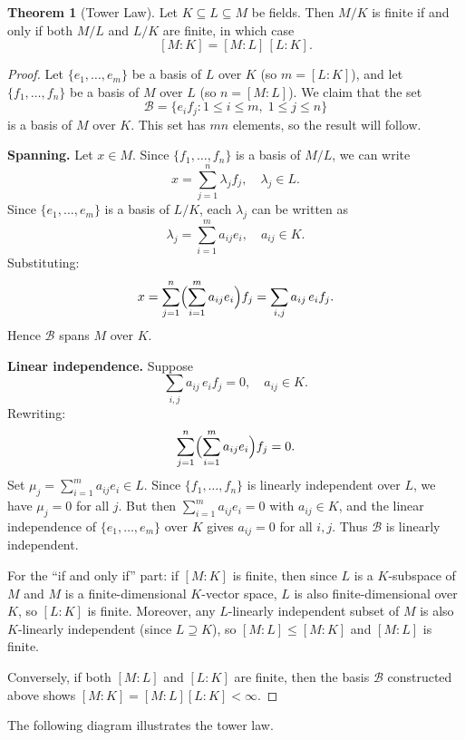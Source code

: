 \documentclass[12pt,a4paper,openany]{book}
\theoremstyle{definition}
\newtheorem{theorem}{Theorem}[chapter]
\theoremstyle{remark}
\begin{document}
\begin{theorem}[Tower Law]
\label{thm:tower-law}
Let $K \subseteq L \subseteq M$ be fields. Then $M/K$ is finite if and
only if both $M/L$ and $L/K$ are finite, in which case
\[
  [M:K] = [M:L]\,[L:K].
\]
\end{theorem}

\begin{proof}
Let $\{e_1, \dots, e_m\}$ be a basis of $L$ over $K$ (so
$m = [L:K]$), and let $\{f_1, \dots, f_n\}$ be a basis of $M$ over
$L$ (so $n = [M:L]$). We claim that the set
\[
  \mathcal{B} = \{ e_i f_j : 1 \le i \le m,\; 1 \le j \le n \}
\]
is a basis of $M$ over $K$. This set has $mn$ elements, so the result
will follow.

\textbf{Spanning.} Let $x \in M$. Since $\{f_1, \dots, f_n\}$ is a
basis of $M/L$, we can write
\[
  x = \sum_{j=1}^n \lambda_j f_j, \quad \lambda_j \in L.
\]
Since $\{e_1, \dots, e_m\}$ is a basis of $L/K$, each $\lambda_j$ can
be written as
\[
  \lambda_j = \sum_{i=1}^m a_{ij} e_i, \quad a_{ij} \in K.
\]
Substituting:
\[
  x = \sum_{j=1}^n \Bigl(\sum_{i=1}^m a_{ij} e_i\Bigr) f_j
    = \sum_{i,j} a_{ij}\, e_i f_j.
\]
Hence $\mathcal{B}$ spans $M$ over $K$.

\textbf{Linear independence.} Suppose
\[
  \sum_{i,j} a_{ij}\, e_i f_j = 0, \quad a_{ij} \in K.
\]
Rewriting:
\[
  \sum_{j=1}^n \Bigl(\sum_{i=1}^m a_{ij} e_i\Bigr) f_j = 0.
\]
Set $\mu_j = \sum_{i=1}^m a_{ij} e_i \in L$. Since
$\{f_1, \dots, f_n\}$ is linearly independent over $L$, we have
$\mu_j = 0$ for all $j$. But then
$\sum_{i=1}^m a_{ij} e_i = 0$ with $a_{ij} \in K$, and the
linear independence of $\{e_1, \dots, e_m\}$ over $K$ gives
$a_{ij} = 0$ for all $i, j$. Thus $\mathcal{B}$ is linearly
independent.

For the ``if and only if'' part: if $[M:K]$ is finite, then since
$L$ is a $K$-subspace of $M$ and $M$ is a finite-dimensional
$K$-vector space, $L$ is also finite-dimensional over $K$, so $[L:K]$
is finite. Moreover, any $L$-linearly independent subset of $M$ is also
$K$-linearly independent (since $L \supseteq K$), so $[M:L] \le [M:K]$
and $[M:L]$ is finite.

Conversely, if both $[M:L]$ and $[L:K]$ are finite, then the basis
$\mathcal{B}$ constructed above shows $[M:K] = [M:L][L:K] < \infty$.
\end{proof}

The following diagram illustrates the tower law.
\begin{center}
\qquad
{}\qquad
{}
\end{center}
\end{document}
